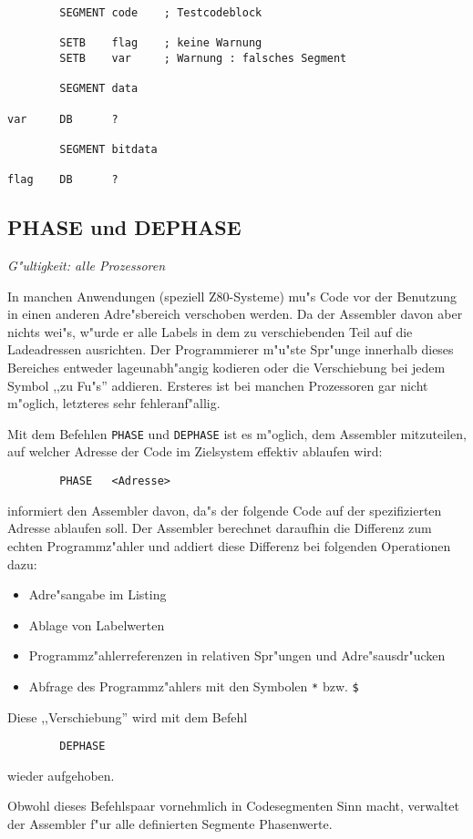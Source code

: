 \documentclass[12pt,a4paper,twoside]{report}
\makeatletter
\newcommand{\tty}[1]{{\tt #1}}
\newcommand{\ttindex}[1]{\index{#1@{\tt #1}}}
\makeatother
\begin{document}
{\begin{verbatim}
        SEGMENT code    ; Testcodeblock

        SETB    flag    ; keine Warnung
        SETB    var     ; Warnung : falsches Segment

        SEGMENT data

var     DB      ?

        SEGMENT bitdata

flag    DB      ?
\end{verbatim}


\subsection{PHASE und DEPHASE}
\ttindex{PHASE}\ttindex{DEPHASE}

{\em G"ultigkeit: alle Prozessoren}

In manchen Anwendungen (speziell Z80-Systeme) mu"s Code vor der
Benutzung in einen anderen Adre"sbereich verschoben werden.  Da der
Assembler davon aber nichts wei"s, w"urde er alle Labels in dem zu
verschiebenden Teil auf die Ladeadressen ausrichten.  Der Programmierer
m"u"ste Spr"unge innerhalb dieses Bereiches entweder lageunabh"angig
kodieren oder die Verschiebung bei jedem Symbol ,,zu Fu"s'' addieren.
Ersteres ist bei manchen Prozessoren gar nicht m"oglich, letzteres sehr
fehleranf"allig.
\par
Mit dem Befehlen \tty{PHASE} und \tty{DEPHASE} ist es m"oglich, dem
Assembler mitzuteilen, auf welcher Adresse der Code im Zielsystem
effektiv ablaufen wird:
\begin{verbatim}
        PHASE   <Adresse>
\end{verbatim}
informiert den Assembler davon, da"s der folgende Code auf der
spezifizierten Adresse ablaufen soll.  Der Assembler berechnet
daraufhin die Differenz zum echten Programmz"ahler und addiert diese
Differenz bei folgenden Operationen dazu:
\begin{itemize}
\item{Adre"sangabe im Listing}
\item{Ablage von Labelwerten}
\item{Programmz"ahlerreferenzen in relativen Spr"ungen und
      Adre"sausdr"ucken}
\item{Abfrage des Programmz"ahlers mit den Symbolen \verb!*! bzw. \verb!$!}
\end{itemize}
Diese ,,Verschiebung'' wird mit dem Befehl
\begin{verbatim}
        DEPHASE
\end{verbatim}
wieder aufgehoben.
\par
Obwohl dieses Befehlspaar vornehmlich in Codesegmenten Sinn macht,
verwaltet der Assembler f"ur alle definierten Segmente Phasenwerte.

}
\end{document}
